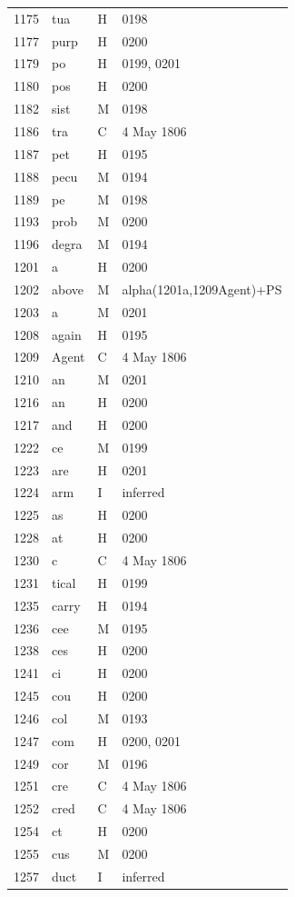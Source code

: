 \begin{longtable}{@{}rlll@{}}
1175 & tua & H & 0198 \\
1177 & purp & H & 0200 \\
1179 & po & H & 0199, 0201 \\
1180 & pos & H & 0200 \\
1182 & sist & M & 0198 \\
1186 & tra & C & 4 May 1806 \\
1187 & pet & H & 0195 \\
1188 & pecu & M & 0194 \\
1189 & pe & M & 0198 \\
1193 & prob & M & 0200 \\
1196 & degra & M & 0194 \\
1201 & a & H & 0200 \\
1202 & above & M & alpha(1201a,1209Agent)+PS \\
1203 & a & M & 0201 \\
1208 & again & H & 0195 \\
1209 & Agent & C & 4 May 1806 \\
1210 & an & M & 0201 \\
1216 & an & H & 0200 \\
1217 & and & H & 0200 \\
1222 & ce & M & 0199 \\
1223 & are & H & 0201 \\
1224 & arm & I & inferred \\
1225 & as & H & 0200 \\
1228 & at & H & 0200 \\
1230 & c & C & 4 May 1806 \\
1231 & tical & H & 0199 \\
1235 & carry & H & 0194 \\
1236 & cee & M & 0195 \\
1238 & ces & H & 0200 \\
1241 & ci & H & 0200 \\
1245 & cou & H & 0200 \\
1246 & col & M & 0193 \\
1247 & com & H & 0200, 0201 \\
1249 & cor & M & 0196 \\
1251 & cre & C & 4 May 1806 \\
1252 & cred & C & 4 May 1806 \\
1254 & ct & H & 0200 \\
1255 & cus & M & 0200 \\
1257 & duct & I & inferred \\

\end{longtable}
